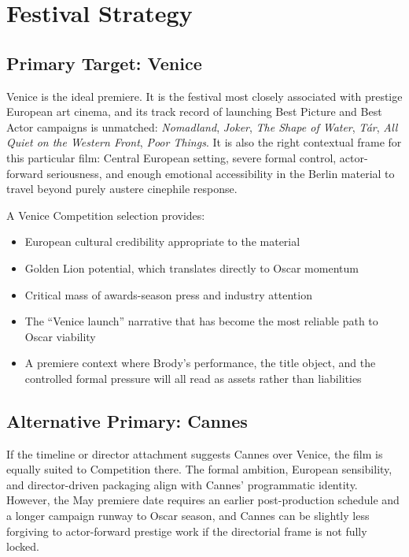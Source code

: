 
\section{Festival Strategy}

\subsection{Primary Target: Venice}

Venice is the ideal premiere. It is the festival most closely associated with prestige European art cinema, and its track record of launching Best Picture and Best Actor campaigns is unmatched: \textit{Nomadland}, \textit{Joker}, \textit{The Shape of Water}, \textit{T\'{a}r}, \textit{All Quiet on the Western Front}, \textit{Poor Things}. It is also the right contextual frame for this particular film: Central European setting, severe formal control, actor-forward seriousness, and enough emotional accessibility in the Berlin material to travel beyond purely austere cinephile response.

A Venice Competition selection provides:
\begin{itemize}[leftmargin=*]
\item European cultural credibility appropriate to the material
\item Golden Lion potential, which translates directly to Oscar momentum
\item Critical mass of awards-season press and industry attention
\item The ``Venice launch'' narrative that has become the most reliable path to Oscar viability
\item A premiere context where Brody's performance, the title object, and the controlled formal pressure will all read as assets rather than liabilities
\end{itemize}

\subsection{Alternative Primary: Cannes}

If the timeline or director attachment suggests Cannes over Venice, the film is equally suited to Competition there. The formal ambition, European sensibility, and director-driven packaging align with Cannes' programmatic identity. However, the May premiere date requires an earlier post-production schedule and a longer campaign runway to Oscar season, and Cannes can be slightly less forgiving to actor-forward prestige work if the directorial frame is not fully locked.

